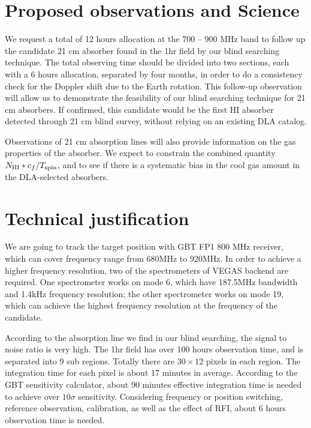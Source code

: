 \documentclass[prl,twocolumn,floatfix,superscriptaddress,nofootinbib,aps]{revtex4}
\begin{document}
\section{Proposed observations and Science}
We request a total of 12 hours allocation at the 700 -- 900 MHz band to follow up the candidate 21 cm absorber found in the 1hr field by our blind searching 
technique. The total observing time should be divided into two sections, each with a 6 hours allocation, separated by four months, in order to do a 
consistency check for the Doppler shift due to the Earth rotation. 
This follow-up observation will allow us to demonstrate the feasibility of our 
blind searching technique for 21 cm absorbers. If confirmed, this candidate 
would be the first HI absorber detected through 21 cm blind survey, without 
relying on an existing DLA catalog. 

Observations of 21 cm absorption lines will also provide information on the gas
properties of the absorber. We expect to constrain the combined quantity 
$N_{\rm HI}*c_f/T_{\rm spin}$, and to see if there is a systematic bias in the 
cool gas amount in the DLA-selected absorbers.



\section{Technical justification}

We are going to track the target position with GBT FP1 800 MHz receiver, which 
can cover frequency range from 680MHz to 920MHz. In order to achieve a higher
frequency resolution, two of the spectrometers of VEGAS backend are required.
One spectrometer works on mode 6, which have 187.5MHz bandwidth and 1.4kHz 
frequency resolution; the other spectrometer works on mode 19, which can 
achieve the highest frequency resolution at the frequency of the candidate. 

According to the absorption line we find in our blind searching, the signal to 
noise ratio is very high. The 1hr field has over 100 hours observation time, and is separated into 9 sub regions. Totally there are $30\times12$ pixels in each region. The integration time for
each pixel is about 17 minutes in average. According to the GBT 
sensitivity calculator, about 90 minutes effective integration time is needed 
to achieve over $10\sigma$ sensitivity. Considering frequency or position 
switching, reference observation, calibration, as well as the effect of RFI, 
about 6 hours observation time is needed.
\end{document}
